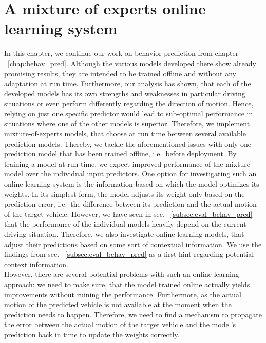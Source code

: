 \chapter{A mixture of experts online learning system}
\label{chap:mix_online_learning}

In this chapter, we continue our work on behavior prediction from chapter ~\ref{chap:behav_pred}.
Although the various models developed there show already promising results, they are intended to be trained offline and without any adaptation at run time.
Furthermore, our analysis has shown, that each of the developed models has its own strengths and weaknesses in particular driving situations or even perform differently regarding the direction of motion.
Hence, relying on just one specific predictor would lead to sub-optimal performance in situations where one of the other models is superior.
Therefore, we implement mixture-of-experts models, that choose at run time between several available prediction models.
Thereby, we tackle the aforementioned issues with only one prediction model that has been trained offline, i.e.\ before deployment.
By training a model at run time, we expect improved performance of the mixture model over the individual input predictors.
One option for investigating such an online learning system is the information based on which the model optimizes its weights.
In its simplest form, the model adjusts its weight only based on the prediction error, i.e.\ the difference between its prediction and the actual motion of the target vehicle.
However, we have seen in sec. ~\ref{subsec:eval_behav_pred} that the performance of the individual models heavily depend on the current driving situation.
Therefore, we also investigate online learning models, that adjust their predictions based on some sort of contextual information.
We use the findings from sec. ~\ref{subsec:eval_behav_pred} as a first hint regarding potential context information.\\  
However, there are several potential problems with such an online learning approach: we need to make sure, that the model trained online actually yields improvements without ruining the performance.
Furthermore, as the actual motion of the predicted vehicle is not available at the moment when the prediction needs to happen.
Therefore, we need to find a mechanism to propagate the error between the actual motion of the target vehicle and the model's prediction back in time to update the weights correctly.

